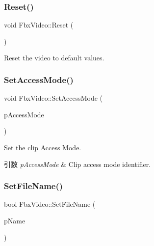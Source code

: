\mbox{\label{class_fbx_video_a135c575d14d2ba47c901920687f0e52c}} 
\subsubsection{\texorpdfstring{Reset()}{Reset()}}
{\footnotesize\ttfamily void Fbx\+Video\+::\+Reset (\begin{DoxyParamCaption}{ }\end{DoxyParamCaption})}



Reset the video to default values. 

\mbox{\label{class_fbx_video_a7c593f34c56ecb905de956d50048a4f5}} 
\subsubsection{\texorpdfstring{Set\+Access\+Mode()}{SetAccessMode()}}
{\footnotesize\ttfamily void Fbx\+Video\+::\+Set\+Access\+Mode (\begin{DoxyParamCaption}\item[{\hyperlink{class_fbx_video_a6dd88dabb2170adcd8c58952ed2e0c40}{E\+Access\+Mode}}]{p\+Access\+Mode }\end{DoxyParamCaption})}

Set the clip Access Mode. 
\begin{DoxyParams}{引数}
{\em p\+Access\+Mode} & Clip access mode identifier. \\
\hline
\end{DoxyParams}
\mbox{\label{class_fbx_video_a897a450c62670d4730cb9ee663a26ea2}} 
\subsubsection{\texorpdfstring{Set\+File\+Name()}{SetFileName()}}
{\footnotesize\ttfamily bool Fbx\+Video\+::\+Set\+File\+Name (\begin{DoxyParamCaption}\item[{const char $\ast$}]{p\+Name }\end{DoxyParamCaption})}

